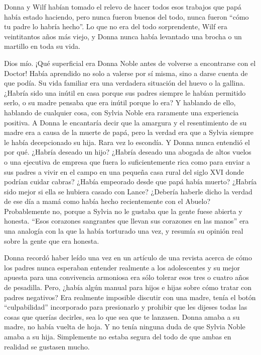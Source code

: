 Donna y Wilf habían tomado el relevo de hacer todos esos trabajos que
papá había estado haciendo, pero nunca fueron buenos del todo, nunca
fueron ``cómo tu padre lo habría hecho''. Lo que no era del todo
sorprendente, Wilf era veintitantos años más viejo, y Donna nunca había
levantado una brocha o un martillo en toda su vida.

Dios mío. ¡Qué superficial era Donna Noble antes de volverse a
encontrarse con el Doctor! Había aprendido no solo a valerse por sí
misma, sino a darse cuenta de que podía. Su vida familiar era una
verdadera situación del huevo o la gallina. ¿Habría sido una inútil en
casa porque sus padres siempre le habían permitido serlo, o su madre
pensaba que era inútil porque lo era? Y hablando de ello, hablando de
cualquier cosa, con Sylvia Noble era raramente una experiencia positiva.
A Donna le encantaría decir que la amargura y el resentimiento de su
madre era a causa de la muerte de papá, pero la verdad era que a Sylvia
siempre le había decepcionado su hija. Rara vez lo escondía. Y Donna
nunca entendió el por qué. ¿Habría deseado un hijo? ¿Habría deseado una
abogada de altos vuelos o una ejecutiva de empresa que fuera lo
suficientemente rica como para enviar a sus padres a vivir en el campo
en una pequeña casa rural del siglo XVI donde podrían cuidar cabras?
¿Había empeorado desde que papá había muerto? ¿Habría sido mejor si
ella se hubiera casado con Lance? ¿Debería haberle dicho la verdad de
ese día a mamá como había hecho recientemente con el Abuelo?
Probablemente no, porque a Sylvia no le gustaba que la gente fuese
abierta y honesta. ``Esos corazones sangrantes que llevan sus corazones
en las manos'' era una analogía con la que la había torturado una vez, y
resumía su opinión real sobre la gente que era honesta.

Donna recordó haber leído una vez en un artículo de una revista acerca
de cómo los padres nunca esperaban entender realmente a los adolescentes
y su mejor apuesta para una convivencia armoniosa era sólo tolerar esos
tres o cuatro años de pesadilla. Pero, ¿había algún manual para hijos e
hijas sobre cómo tratar con padres negativos? Era realmente imposible
discutir con una madre, tenía el botón ``culpabilidad'' incorporado para
presionarlo y prohibir que les dijeses todas las cosas que querías
decirles, sea lo que sea que te lanzasen. Donna amaba a su madre, no
había vuelta de hoja. Y no tenía ninguna duda de que Sylvia Noble amaba
a su hija. Simplemente no estaba segura del todo de que ambas en
realidad se gustasen mucho.

